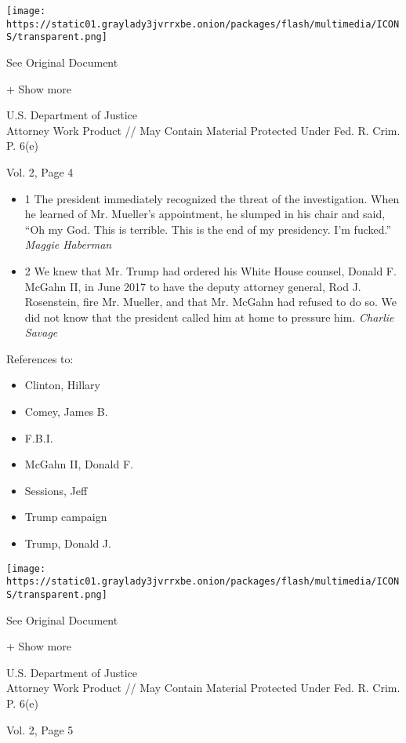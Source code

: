 \protect\hyperlink{}{}

\texttt{[image: https://static01.graylady3jvrrxbe.onion/packages/flash/multimedia/ICONS/transparent.png]}

See Original Document

+ Show more

U.S. Department of Justice\\
Attorney Work Product // May Contain Material Protected Under Fed. R.
Crim. P. 6(e)

Vol. 2, Page 4

\begin{itemize}
\tightlist
\item
  1 The president immediately recognized the threat of the
  investigation. When he learned of Mr. Mueller's appointment, he
  slumped in his chair and said, ``Oh my God. This is terrible. This is
  the end of my presidency. I'm fucked.'' \emph{Maggie Haberman}
\item
  2 We knew that Mr. Trump had ordered his White House counsel, Donald
  F. McGahn II, in June 2017 to have the deputy attorney general, Rod J.
  Rosenstein, fire Mr. Mueller, and that Mr. McGahn had refused to do
  so. We did not know that the president called him at home to pressure
  him. \emph{Charlie Savage}
\end{itemize}

References to:

\begin{itemize}
\tightlist
\item
  Clinton, Hillary
\item
  Comey, James B.
\item
  F.B.I.
\item
  McGahn II, Donald F.
\item
  Sessions, Jeff
\item
  Trump campaign
\item
  Trump, Donald J.
\end{itemize}

\protect\hyperlink{}{}

\texttt{[image: https://static01.graylady3jvrrxbe.onion/packages/flash/multimedia/ICONS/transparent.png]}

See Original Document

+ Show more

U.S. Department of Justice\\
Attorney Work Product // May Contain Material Protected Under Fed. R.
Crim. P. 6(e)

Vol. 2, Page 5

